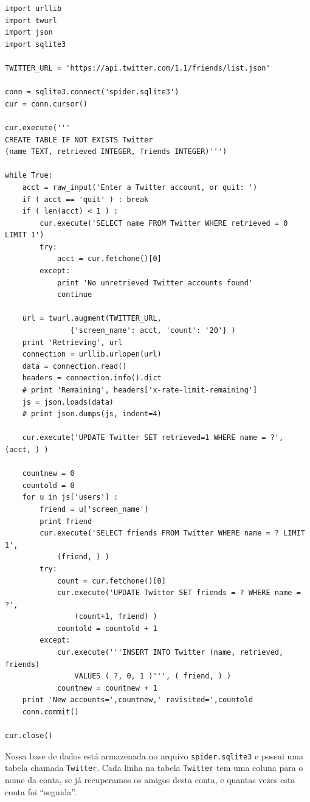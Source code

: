 \beforeverb
\begin{verbatim}
import urllib
import twurl
import json
import sqlite3

TWITTER_URL = 'https://api.twitter.com/1.1/friends/list.json'

conn = sqlite3.connect('spider.sqlite3')
cur = conn.cursor()

cur.execute('''
CREATE TABLE IF NOT EXISTS Twitter 
(name TEXT, retrieved INTEGER, friends INTEGER)''')

while True:
    acct = raw_input('Enter a Twitter account, or quit: ')
    if ( acct == 'quit' ) : break
    if ( len(acct) < 1 ) :
        cur.execute('SELECT name FROM Twitter WHERE retrieved = 0 LIMIT 1')
        try:
            acct = cur.fetchone()[0]
        except:
            print 'No unretrieved Twitter accounts found'
            continue

    url = twurl.augment(TWITTER_URL, 
               {'screen_name': acct, 'count': '20'} )
    print 'Retrieving', url
    connection = urllib.urlopen(url)
    data = connection.read()
    headers = connection.info().dict
    # print 'Remaining', headers['x-rate-limit-remaining']
    js = json.loads(data)
    # print json.dumps(js, indent=4)

    cur.execute('UPDATE Twitter SET retrieved=1 WHERE name = ?', (acct, ) )

    countnew = 0
    countold = 0
    for u in js['users'] :
        friend = u['screen_name']
        print friend
        cur.execute('SELECT friends FROM Twitter WHERE name = ? LIMIT 1', 
            (friend, ) )
        try:
            count = cur.fetchone()[0]
            cur.execute('UPDATE Twitter SET friends = ? WHERE name = ?', 
                (count+1, friend) )
            countold = countold + 1
        except:
            cur.execute('''INSERT INTO Twitter (name, retrieved, friends) 
                VALUES ( ?, 0, 1 )''', ( friend, ) )
            countnew = countnew + 1
    print 'New accounts=',countnew,' revisited=',countold
    conn.commit()

cur.close()
\end{verbatim}
\afterverb
%

%
Nossa base de dados está armazenada no arquivo {\tt spider.sqlite3} e possui
uma tabela chamada {\tt Twitter}. Cada linha na tabela {\tt Twitter} tem uma
coluna para o nome da conta, se já recuperamos os amigos desta conta, e quantas
vezes esta conta foi ``seguida''.

